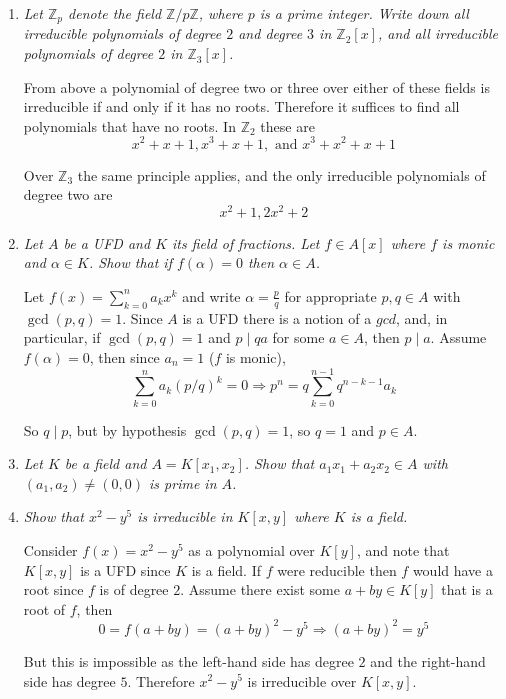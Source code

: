 \documentclass[10pt]{article}
\newcommand{\Z}{\mathbb{Z}}
\begin{document}
\begin{enumerate}
\begin{enumerate}
\end{enumerate}

\item \emph{Let $\Z_p$ denote the field $\Z / p\Z$, where $p$ is a prime integer.  Write down all irreducible polynomials of degree $2$ and degree $3$ in $\Z_2[x]$, and all irreducible polynomials of degree $2$ in $\Z_3[x]$.}

From above a polynomial of degree two or three over either of these fields is irreducible if and only if it has no roots.  Therefore it suffices to find all polynomials that have no roots.  In $\Z_2$ these are
\[
x^2+x+1, x^3+x+1, \mbox{ and } x^3 + x^2 + x + 1
\]

Over $\Z_3$ the same principle applies, and the only irreducible polynomials of degree two are
\[
x^2+1, 2x^2+2
\]

\item \emph{Let $A$ be a UFD and $K$ its field of fractions.  Let $f \in A[x]$ where $f$ is monic and $\alpha \in K$.  Show that if $f(\alpha) = 0$ then $\alpha \in A$.}

Let $f(x) = \sum_{k=0}^n a_kx^k$ and write $\alpha = \frac{p}{q}$ for appropriate $p,q \in A$ with $\gcd(p,q) = 1$.  Since $A$ is a UFD there is a notion of a $gcd$, and, in particular, if $\gcd(p,q) = 1$ and $p \mid qa$ for some $a \in A$, then $p \mid a$.  Assume $f(\alpha) = 0$, then since $a_n = 1$ ($f$ is monic), 
\[
\sum_{k=0}^n a_k (p/q)^k = 0 \Rightarrow p^n = q \sum_{k=0}^{n-1} q^{n-k-1} a_k 
\]

So $q \mid p$, but by hypothesis $\gcd(p,q) = 1$, so $q = 1$ and $p \in A$.

\item \emph{Let $K$ be a field and $A = K[x_1, x_2]$.  Show that $a_1x_1 + a_2x_2 \in A$ with $(a_1, a_2) \neq (0,0)$ is prime in $A$.}

\item \emph{Show that $x^2 - y^5$ is irreducible in $K[x,y]$ where $K$ is a field.}

Consider $f(x) = x^2 - y^5$ as a polynomial over $K[y]$, and note that $K[x,y]$ is a UFD since $K$ is a field.  If $f$ were reducible then $f$ would have a root since $f$ is of degree $2$.  Assume there exist some $a+by \in K[y]$ that is a root of $f$, then
\[
0 = f(a+by) = (a+by)^2 - y^5 \Rightarrow (a+by)^2 = y^5
\]

But this is impossible as the left-hand side has degree $2$ and the right-hand side has degree $5$.  Therefore $x^2 - y^5$ is irreducible over $K[x,y]$.
\end{enumerate}
\end{document}
